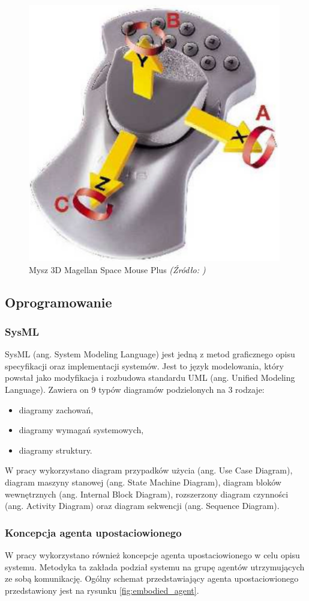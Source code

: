 \documentclass[a4paper, 12pt, twoside]{article}
\begin{document}
\begin{figure}[hbt!]
\centering
\includegraphics[width=0.4\linewidth]{images/mouse.png}
\caption{Mysz 3D Magellan Space Mouse Plus\textit{ (Źródło: \cite{spacemouse}) } }
\label{fig:mouse}
\end{figure}

\subsection{Oprogramowanie}

\subsubsection{SysML}

SysML (ang. System Modeling Language)\cite{sysml} jest jedną z metod graficznego opisu specyfikacji oraz implementacji systemów. Jest to język modelowania, który powstał jako modyfikacja i rozbudowa standardu UML (ang. Unified Modeling Language). Zawiera on 9 typów diagramów podzielonych na 3 rodzaje: 
\begin{itemize}
\item diagramy zachowań,
\item diagramy wymagań systemowych,
\item diagramy struktury.
\end{itemize}

W pracy wykorzystano diagram przypadków użycia (ang. Use Case Diagram), diagram maszyny stanowej (ang. State Machine Diagram), diagram bloków wewnętrznych (ang. Internal Block Diagram), rozszerzony diagram czynności (ang. Activity Diagram) oraz diagram sekwencji (ang. Sequence Diagram).

\subsubsection{Koncepcja agenta upostaciowionego}

W pracy wykorzystano również koncepcje agenta upostaciowionego \cite{embodiedagent} w celu opisu systemu. Metodyka ta zakłada podział systemu na grupę agentów utrzymujących ze sobą komunikację. Ogólny schemat przedstawiający agenta upostaciowionego przedstawiony jest na rysunku \ref{fig:embodied_agent}.
\end{document}
